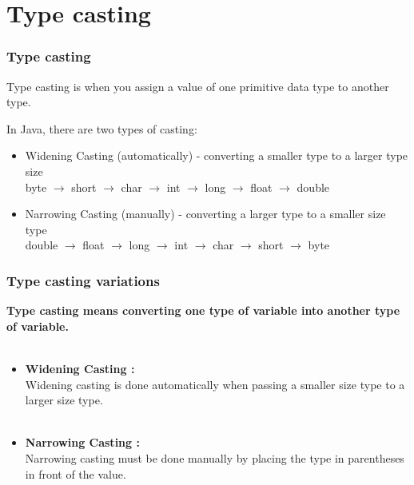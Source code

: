 \documentclass{beamer}
\begin{document}
\section{Type casting}

\begin{frame}[fragile]
\frametitle{Type casting}
Type casting is when you assign a value of one primitive data type to another type.

In Java, there are two types of casting:
\begin{itemize}
\item Widening Casting (automatically) - converting a smaller type to a larger type size\\
byte $\rightarrow$  short $\rightarrow$ char $\rightarrow$ int $\rightarrow$ long $\rightarrow$ float $\rightarrow$ double

\item Narrowing Casting (manually) - converting a larger type to a smaller size type\\
double $\rightarrow$ float $\rightarrow$ long $\rightarrow$  int $\rightarrow$ char $\rightarrow$ short $\rightarrow$ byte
\end{itemize}
\end{frame}



\begin{frame}
\frametitle{Type casting variations}
\textbf{Type casting means converting one type of variable into another type of variable.\\~\\}
\begin{itemize}
\item \textbf{Widening Casting :\\}
Widening casting is done automatically when passing a smaller size type to a larger size type.\\~\\
\item \textbf{Narrowing Casting :\\}
Narrowing casting must be done manually by placing the type in parentheses in front of the value.
\end{itemize}
\end{frame}


\end{document}
